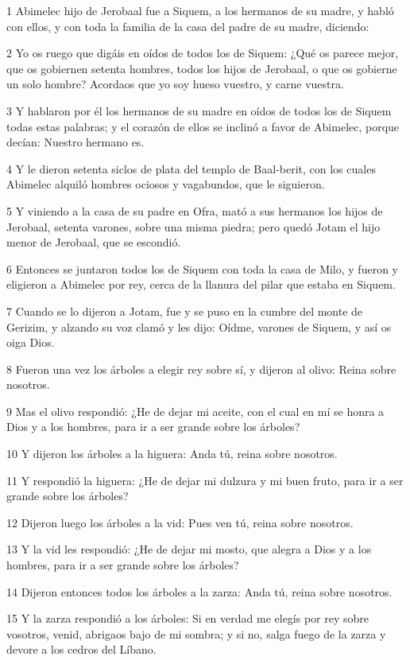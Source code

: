 \par 1 Abimelec hijo de Jerobaal fue a Siquem, a los hermanos de su madre, y habló con ellos, y con toda la familia de la casa del padre de su madre, diciendo:
\par 2 Yo os ruego que digáis en oídos de todos los de Siquem: ¿Qué os parece mejor, que os gobiernen setenta hombres, todos los hijos de Jerobaal, o que os gobierne un solo hombre? Acordaos que yo soy hueso vuestro, y carne vuestra.
\par 3 Y hablaron por él los hermanos de su madre en oídos de todos los de Siquem todas estas palabras; y el corazón de ellos se inclinó a favor de Abimelec, porque decían: Nuestro hermano es.
\par 4 Y le dieron setenta siclos de plata   del templo de Baal-berit, con los cuales Abimelec alquiló hombres ociosos y vagabundos, que le siguieron.
\par 5 Y viniendo a la casa de su padre en Ofra, mató a sus hermanos los hijos de Jerobaal, setenta varones, sobre una misma piedra; pero quedó Jotam el hijo menor de Jerobaal, que se escondió.
\par 6 Entonces se juntaron todos los de Siquem con toda la casa de Milo, y fueron y eligieron a Abimelec por rey, cerca de la llanura del pilar que estaba en Siquem.
\par 7 Cuando se lo dijeron a Jotam, fue y se puso en la cumbre del monte de Gerizim, y alzando su voz clamó y les dijo: Oídme, varones de Siquem, y así os oiga Dios.
\par 8 Fueron una vez los árboles a elegir rey sobre sí, y dijeron al olivo: Reina sobre nosotros.
\par 9 Mas el olivo respondió: ¿He de dejar mi aceite, con el cual en mí se honra a Dios y a los hombres, para ir a ser grande sobre los árboles?
\par 10 Y dijeron los árboles a la higuera: Anda tú, reina sobre nosotros.
\par 11 Y respondió la higuera: ¿He de dejar mi dulzura y mi buen fruto, para ir a ser grande sobre los árboles?
\par 12 Dijeron luego los árboles a la vid: Pues ven tú, reina sobre nosotros.
\par 13 Y la vid les respondió: ¿He de dejar mi mosto, que alegra a Dios y a los hombres, para ir a ser grande sobre los árboles?
\par 14 Dijeron entonces todos los árboles a la zarza: Anda tú, reina sobre nosotros.
\par 15 Y la zarza respondió a los árboles: Si en verdad me elegís por rey sobre vosotros, venid, abrigaos bajo de mi sombra; y si no, salga fuego de la zarza y devore a los cedros del Líbano.
